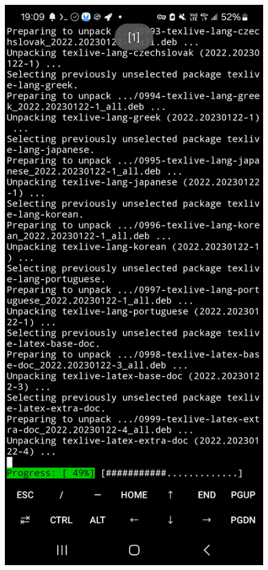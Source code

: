 \documentclass[a4paper,12pt]{article}
\begin{document}
\begin{center}
\begin{figure}[H]
\begin{minipage}[t]{0.45\textwidth}
\end{minipage}
\hfill
\begin{minipage}[t]{0.45\textwidth}
\centering
\includegraphics[width=\textwidth]{./working_screenshots/4.jpg}
\end{minipage}
\hfill
\end{figure}\FloatBarrier\end{center}
\end{document}
